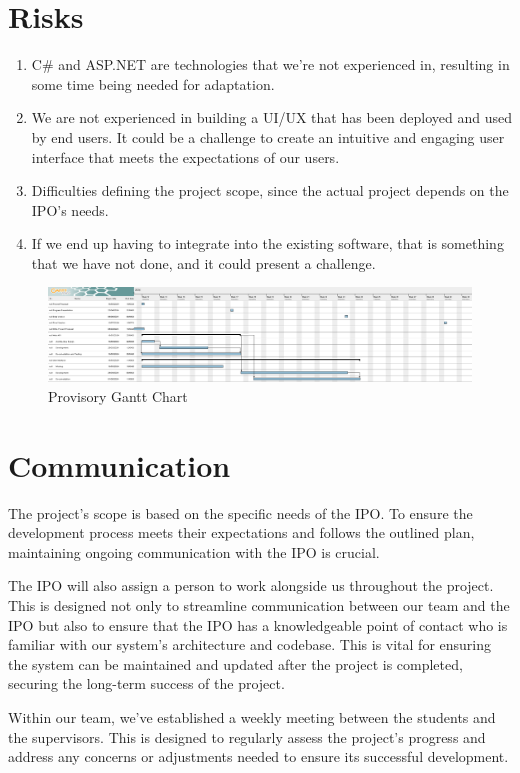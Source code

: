 \documentclass[a4paper,11pt]{article}
\begin{document}
\section{Risks}
\begin{enumerate}
	\item C\# \cite{csharp} and ASP.NET are technologies that we’re not experienced in, resulting in some time being needed for adaptation.

	\item We are not experienced in building a UI/UX that has been deployed and used by end users. It could be a challenge to create an intuitive and engaging user interface that meets the expectations of our users.

	\item Difficulties defining the project scope, since the actual project depends on the IPO's needs.

	\item If we end up having to integrate into the existing software, that is something that we have not done, and it could present a challenge.
\end{enumerate}

\begin{figure}[h]
\centering
\includegraphics[width=\textwidth,height=\textheight,keepaspectratio]{gantt.png}
\caption{Provisory Gantt Chart}
\end{figure}

\section{Communication}
The project's scope is based on the specific needs of the IPO. To ensure the development process meets their expectations and follows the outlined plan, maintaining ongoing communication with the IPO is crucial.

The IPO will also assign a person to work alongside us throughout the project. This is designed not only to streamline communication between our team and the IPO but also to ensure that the IPO has a knowledgeable point of contact who is familiar with our system's architecture and codebase. This is vital for ensuring the system can be maintained and updated after the project is completed, securing the long-term success of the project.

Within our team, we've established a weekly meeting between the students and the supervisors. This is designed to regularly assess the project's progress and address any concerns or adjustments needed to ensure its successful development.

\printbibliography[heading=bibintoc]
\end{document}
